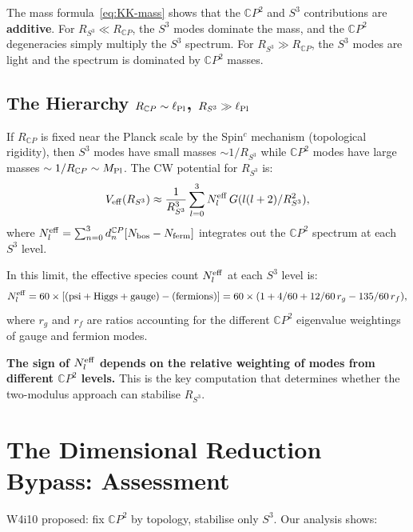 \documentclass[11pt,a4paper]{article}
\newcommand{\CP}{\mathbb{C}P}
\newcommand{\Mpl}{M_{\rm Pl}}
\newcommand{\lPl}{\ell_{\rm Pl}}
\newcommand{\Nbos}{N_{\rm bos}}
\newcommand{\Nferm}{N_{\rm ferm}}
\begin{document}
The mass formula~\eqref{eq:KK-mass} shows that the $\CP^2$ and $S^3$
contributions are \textbf{additive}. For $R_{S^3} \ll R_{\CP}$, the
$S^3$ modes dominate the mass, and the $\CP^2$ degeneracies simply
multiply the $S^3$ spectrum. For $R_{S^3} \gg R_{\CP}$, the $S^3$
modes are light and the spectrum is dominated by $\CP^2$ masses.

\subsection{The Hierarchy $R_{\CP} \sim \lPl$, $R_{S^3} \gg \lPl$}

If $R_{\CP}$ is fixed near the Planck scale by the Spin$^c$
mechanism (topological rigidity), then $S^3$ modes have small
masses $\sim 1/R_{S^3}$ while $\CP^2$ modes have large masses
$\sim 1/R_{\CP} \sim \Mpl$. The CW potential for $R_{S^3}$ is:
\begin{equation}
V_{\rm eff}(R_{S^3}) \approx \frac{1}{R_{S^3}^3}
\sum_{l=0}^3 N_l^{\rm eff}\,G(l(l+2)/R_{S^3}^2),
\end{equation}
where $N_l^{\rm eff} = \sum_{n=0}^3 d_n^{\CP}[\Nbos - \Nferm]$
integrates out the $\CP^2$ spectrum at each $S^3$ level.

In this limit, the effective species count $N_l^{\rm eff}$ at each
$S^3$ level is:
\begin{equation}
N_l^{\rm eff} = 60 \times [(\text{psi} + \text{Higgs} + \text{gauge})
- (\text{fermions})] = 60 \times (1 + 4/60 + 12/60\,r_g - 135/60\,r_f),
\end{equation}
where $r_g$ and $r_f$ are ratios accounting for the different
$\CP^2$ eigenvalue weightings of gauge and fermion modes.

\textbf{The sign of $N_l^{\rm eff}$ depends on the relative
weighting of modes from different $\CP^2$ levels.} This is the
key computation that determines whether the two-modulus approach
can stabilise $R_{S^3}$.


\section{The Dimensional Reduction Bypass: Assessment}
\label{sec:bypass-assessment}

W4i10 proposed: fix $\CP^2$ by topology, stabilise only $S^3$.
Our analysis shows:
\end{document}
